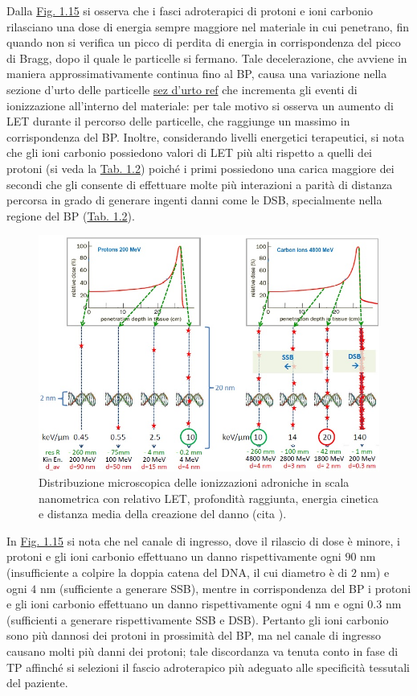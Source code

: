 \documentclass[12pt,a4paper,twoside]{report}
\begin{document}
	Dalla \hyperref[fig:proton_carbon_let]{Fig. 1.15} si osserva che i fasci adroterapici di protoni e ioni carbonio rilasciano una dose di energia sempre maggiore nel materiale in cui penetrano, fin quando non si verifica un picco di perdita di energia in corrispondenza del picco di Bragg, dopo il quale le particelle si fermano. Tale decelerazione, che avviene in maniera approssimativamente continua fino al BP, causa una variazione nella sezione d'urto delle particelle \hyperref[sez]{sez d'urto ref} che incrementa gli eventi di ionizzazione all'interno del materiale: per tale motivo si osserva un aumento di LET durante il percorso delle particelle, che raggiunge un massimo in corrispondenza del BP. Inoltre, considerando livelli energetici terapeutici, si nota che gli ioni carbonio possiedono valori di LET più alti rispetto a quelli dei protoni (si veda la \hyperref[tab:let_rbe]{Tab. 1.2}) poiché i primi possiedono una carica maggiore dei secondi che gli consente di effettuare molte più interazioni a parità di distanza percorsa in grado di generare ingenti danni come le DSB, specialmente nella regione del BP (\hyperref[tab:let_rbe]{Tab. 1.2}).
	
	\begin{figure}[H]
		\centering
		\includegraphics[width=0.9\linewidth]{images/proton_carbon_let.jpg}
		\caption{Distribuzione microscopica delle ionizzazioni adroniche in scala nanometrica con relativo LET, profondità raggiunta, energia cinetica e distanza media della creazione del danno (cita
			).}
		\label{fig:proton_carbon_let}
	\end{figure}
	
	In \hyperref[fig:proton_carbon_let]{Fig. 1.15} si nota che nel canale di ingresso, dove il rilascio di dose è minore, i protoni e gli ioni carbonio effettuano un danno rispettivamente ogni $90 \mbox{ nm}$ (insufficiente a colpire la doppia catena del DNA, il cui diametro è di $2 \mbox{ nm}$) e ogni $4 \mbox{ nm}$ (sufficiente a generare SSB), mentre in corrispondenza del BP i protoni e gli ioni carbonio effettuano un danno rispettivamente ogni $4 \mbox{ nm}$ e ogni $0.3 \mbox{ nm}$ (sufficienti a generare rispettivamente SSB e DSB). Pertanto gli ioni carbonio sono più dannosi dei protoni in prossimità del BP, ma nel canale di ingresso causano molti più danni dei protoni; tale discordanza va tenuta conto in fase di TP affinché si selezioni il fascio adroterapico più adeguato alle specificità tessutali del paziente.
	
\end{document}
